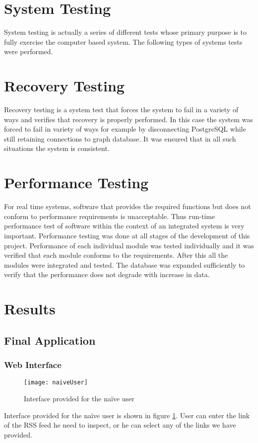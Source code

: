 \section{System Testing}
System testing is actually a series of different tests whose primary purpose is to fully exercise the computer based system. The following types of systems tests were performed.
\section{Recovery Testing}
Recovery testing is a system test that forces the system to fail in a variety of ways and verifies that recovery is properly performed. In this case the system was forced to fail in variety of ways for example by disconnecting PostgreSQL while still retaining connections to graph database. It was ensured that in all such situations the system is consistent.
\section{Performance Testing}
For real time systems, software that provides the required functions but does not conform to performance requirements is unacceptable. Thus run-time performance test of software within the context of an integrated system is very important. Performance testing was done at all stages of the development of this project. Performance of each individual module was tested individually and it was verified that each module conforms to the requirements. After this all the modules were integrated and tested. The database was expanded sufficiently to verify that the performance does not degrade with increase in data.
\section{Results}
\subsection{Final Application}
\subsubsection{Web Interface}
\begin{figure}[h]
	\texttt{[image: naiveUser]}
	\centering
	\caption{Interface provided for the naïve user}
	\label{fig:naiveUser}
\end{figure}
Interface provided for the naïve user is shown in figure \ref{fig:naiveUser}. User can enter the link of the RSS feed he need to inspect, or he can select any of the links we have provided.

